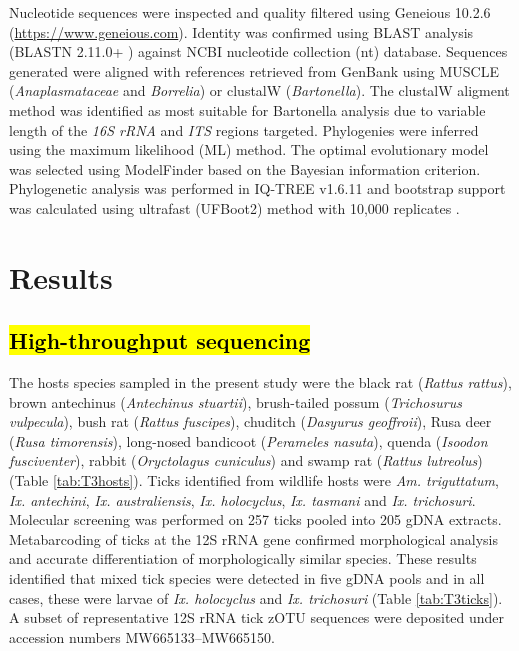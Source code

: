 \documentclass[a4paper, nobind]{templates/ociamthesis}
\begin{document}
Nucleotide sequences were inspected and quality filtered using Geneious 10.2.6 (\url{https://www.geneious.com}).
Identity was confirmed using BLAST analysis (BLASTN 2.11.0+ \autocite{zhangGreedyAlgorithmAligning2000,morgulisDatabaseIndexingProduction2008}) against NCBI nucleotide collection (nt) database.
Sequences generated were aligned with references retrieved from GenBank \autocite{bensonGenBank2017} using MUSCLE \autocite{edgarMUSCLEMultipleSequence2004} (\emph{Anaplasmataceae} and \emph{Borrelia}) or clustalW \autocite{larkinClustalClustalVersion2007} (\emph{Bartonella}).
The clustalW aligment method was identified as most suitable for Bartonella analysis due to variable length of the \emph{16S rRNA} and \emph{ITS} regions targeted.
Phylogenies were inferred using the maximum likelihood (ML) method.
The optimal evolutionary model was selected using ModelFinder \autocite{kalyaanamoorthyModelFinderFastModel2017} based on the Bayesian information criterion. Phylogenetic analysis was performed in IQ-TREE v1.6.11 \autocite{nguyenIQTREEFastEffective2015} and bootstrap support was calculated using ultrafast (UFBoot2) method with 10,000 replicates \autocite{hoangUFBoot2ImprovingUltrafast2018}.

\hypertarget{results}{%
\section{Results}\label{results}}

\hypertarget{high-throughput-sequencing}{%
\subsection{\texorpdfstring{\hl{High-throughput sequencing}}{High-throughput sequencing}}\label{high-throughput-sequencing}}

The hosts species sampled in the present study were the black rat (\emph{Rattus rattus}), brown antechinus (\emph{Antechinus stuartii}), brush-tailed possum (\emph{Trichosurus vulpecula}), bush rat (\emph{Rattus fuscipes}), chuditch (\emph{Dasyurus geoffroii}), Rusa deer (\emph{Rusa timorensis}), long-nosed bandicoot (\emph{Perameles nasuta}), quenda (\emph{Isoodon fusciventer}), rabbit (\emph{Oryctolagus cuniculus}) and swamp rat (\emph{Rattus lutreolus}) (Table \ref{tab:T3hosts}).
Ticks identified from wildlife hosts were \emph{Am. triguttatum}, \emph{Ix. antechini}, \emph{Ix. australiensis}, \emph{Ix. holocyclus}, \emph{Ix. tasmani} and \emph{Ix. trichosuri}.
Molecular screening was performed on 257 ticks pooled into 205 gDNA extracts.
Metabarcoding of ticks at the 12S rRNA gene confirmed morphological analysis and accurate differentiation of morphologically similar species.
These results identified that mixed tick species were detected in five gDNA pools and in all cases, these were larvae of \emph{Ix. holocyclus} and \emph{Ix. trichosuri} (Table \ref{tab:T3ticks}).
A subset of representative 12S rRNA tick zOTU sequences were deposited under accession numbers MW665133--MW665150.
\end{document}
